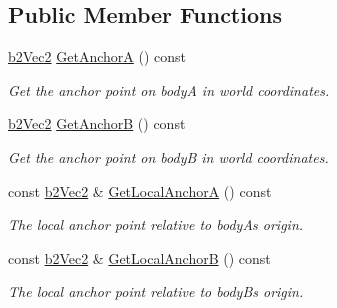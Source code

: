 \subsection*{Public Member Functions}
\begin{DoxyCompactItemize}
\item 
\mbox{\label{classb2RevoluteJoint_a5c2f2baf0544e6c62b2ab3f0c9200b10}} 
\hyperlink{structb2Vec2}{b2\+Vec2} \hyperlink{classb2RevoluteJoint_a5c2f2baf0544e6c62b2ab3f0c9200b10}{Get\+AnchorA} () const
\begin{DoxyCompactList}\small\item\em Get the anchor point on bodyA in world coordinates. \end{DoxyCompactList}\item 
\mbox{\label{classb2RevoluteJoint_ada46548d2167b4f9a63c0eddb7fae669}} 
\hyperlink{structb2Vec2}{b2\+Vec2} \hyperlink{classb2RevoluteJoint_ada46548d2167b4f9a63c0eddb7fae669}{Get\+AnchorB} () const
\begin{DoxyCompactList}\small\item\em Get the anchor point on bodyB in world coordinates. \end{DoxyCompactList}\item 
\mbox{\label{classb2RevoluteJoint_af8cefd09d50a4e349613722809b8c823}} 
const \hyperlink{structb2Vec2}{b2\+Vec2} \& \hyperlink{classb2RevoluteJoint_af8cefd09d50a4e349613722809b8c823}{Get\+Local\+AnchorA} () const
\begin{DoxyCompactList}\small\item\em The local anchor point relative to bodyA\textquotesingle{}s origin. \end{DoxyCompactList}\item 
\mbox{\label{classb2RevoluteJoint_ac58e115df370181adc1ea1c486d84dc6}} 
const \hyperlink{structb2Vec2}{b2\+Vec2} \& \hyperlink{classb2RevoluteJoint_ac58e115df370181adc1ea1c486d84dc6}{Get\+Local\+AnchorB} () const
\begin{DoxyCompactList}\small\item\em The local anchor point relative to bodyB\textquotesingle{}s origin. \end{DoxyCompactList}\item 
\mbox{\label{classb2RevoluteJoint_ae84b9659fe94f41f54f43d3f64ee0741}} 

\end{DoxyCompactItemize}
